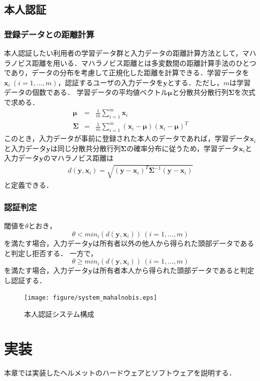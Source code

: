 \documentclass[Japanese,noauthor]{dicomopapers}
\begin{document}
\subsection{本人認証}
\subsubsection{登録データとの距離計算}
本人認証したい利用者の学習データ群と入力データの距離計算方法として，マハラノビス距離を用いる．マハラノビス距離とは多変数間の距離計算手法のひとつであり，データの分布を考慮して正規化した距離を計算できる．学習データを$\bm{x}_i~(i=1,\dots, m)$，認証するユーザの入力データを$\bm{y}$とする．ただし，$m$は学習データの個数である．
学習データの平均値ベクトル$\bm{\mu}$と分散共分散行列$\bm{\Sigma}$を次式で求める．
\begin{eqnarray}
  \bm{\mu} &=& \frac{1}{m}\sum_{i=1}^{m}\bm{x}_i \\
  \bm{\Sigma} &=& \frac{1}{m}\sum_{i=1}^{m}(\bm{x}_i-\bm{\mu})(\bm{x}_i-\bm{\mu})^T
\end{eqnarray}
このとき，入力データが事前に登録された本人のデータであれば，学習データ$\bm{x}_i$と入力データ$\bm{y}$は同じ分散共分散行列$\bm{\Sigma}$の確率分布に従うため，学習データ$\bm{x}_i$と入力データ$\bm{y}$のマハラノビス距離は
\begin{eqnarray}
  d(\bm{y},\bm{x}_i) = \sqrt{(\bm{y}-\bm{x}_i)^{T}\bm{\Sigma}^{-1}(\bm{y}-\bm{x}_i)}
\end{eqnarray}
と定義できる．

\subsubsection{認証判定}
閾値を$\theta$とおき，
\[
  \theta < min_i(d(\bm{y},\bm{x}_i))~(i=1,\dots,m)
\]
を満たす場合，入力データ$\bm{y}$は所有者以外の他人から得られた頭部データであると判定し拒否する．
一方で，
\[
  \theta \geq min_i(d(\bm{y},\bm{x}_i))~(i=1,\dots,m)
\]
を満たす場合，入力データ$\bm{y}$は所有者本人から得られた頭部データであると判定し認証する．

\begin{figure}[!t]
  \centering
    \texttt{[image: figure/system\_mahalnobis.eps]}
  \caption{本人認証システム構成}
  \label{system_mahalnobis}
\end{figure}

\section{実装}
\label{make}
本章では実装したヘルメットのハードウェアとソフトウェアを説明する．
\end{document}
